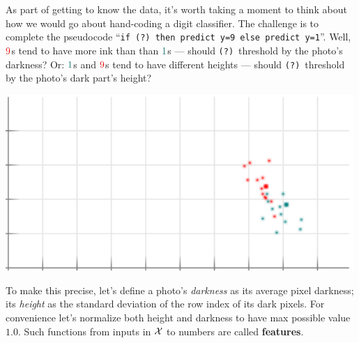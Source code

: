\documentclass[11pt, justified]{tufte-book}
\newcommand{\plainfootprint}{}
\newcommand{\footprint}{\marginnote{\plainfootprint} }
\theoremstyle{definition}
\begin{document}
        \footprint
        As part of getting to know the data, it's worth taking a moment to
        think about how we would go about hand-coding a digit classifier.  The
        challenge is to complete the pseudocode
        ``\texttt{if (?)\ then predict y=9 else predict y=1}''.
        Well, ${\red{9}}$s tend to have more ink than than ${\cya{1}}$s ---
        should \texttt{(?)}\ threshold by the photo's darkness?
        Or: ${\cya{1}}$s and ${\red{9}}$s tend to have different heights ---
        should \texttt{(?)}\ threshold by the photo's dark part's height?

        \begin{marginfigure}
          \centering
          \includegraphics[width=0.99\textwidth]{example-mnist/train-plain}
          \caption{
            Our size-$N=25$ set of training examples, viewed in the
            darkness-height plane.  The vertical \emph{darkness} axis ranges
            $[0.0,0.25]$; the horizontal \emph{height} axis ranges $[0.0,0.5]$.
            The origin is at the lower left.  Each {} dot represents a
            $y={\cya{1}}$ example; each {} dot, a $y={\red{9}}$ one.
            The big ${\red{9}}$ above has darkness and height $(0.118, 0.375)$;\
            the big ${\cya{1}}$, $(0.092, 0.404)$.  See where they are in this
            plot?
          }
        \end{marginfigure}

        To make this precise, let's define a photo's \emph{darkness} as its
        average pixel darkness; its \emph{height} as the standard deviation of
        the row index of its dark pixels.  For convenience let's normalize
        both height and darkness to have max possible value $1.0$.  Such
        functions from inputs in $\mathcal{X}$ to numbers are called
        \textbf{features}.\footprint
\end{document}

